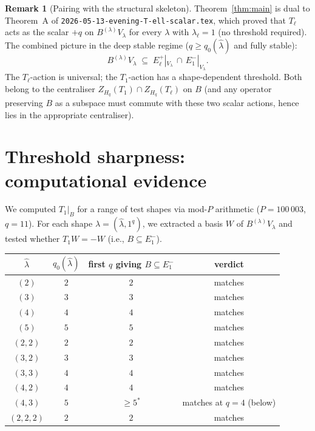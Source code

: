 \documentclass[11pt]{article}
\theoremstyle{definition}
\newtheorem{remark}[theorem]{Remark}
\begin{document}
\begin{remark}[Pairing with the structural skeleton]
Theorem~\ref{thm:main} is dual to Theorem~A of
\texttt{2026-05-13-evening-T-ell-scalar.tex}, which proved that
$T_\ell$ acts as the scalar $+q$ on $B^{(\lambda)} V_\lambda$ for
every $\lambda$ with $\lambda_\ell = 1$ (no threshold required). The
combined picture in the deep stable regime ($q \ge q_0(\hat\lambda)$
and fully stable):
\[
   B^{(\lambda)} V_\lambda
   \;\subseteq\;
   E_\ell^+|_{V_\lambda}\,\cap\,E_1^-|_{V_\lambda}.
\]
The $T_\ell$-action is universal; the $T_1$-action has a
shape-dependent threshold. Both belong to the centraliser
$Z_{H_q}(T_1) \cap Z_{H_q}(T_\ell)$ on $B$ (and any operator preserving
$B$ as a subspace must commute with these two scalar actions, hence
lies in the appropriate centraliser).
\end{remark}

\section{Threshold sharpness: computational evidence}\label{sec:sharp}

We computed $T_1|_B$ for a range of test shapes via mod-$P$ arithmetic
($P = 100\,003$, $q = 11$). For each shape $\lambda = (\hat\lambda, 1^q)$,
we extracted a basis $W$ of $B^{(\lambda)} V_\lambda$ and tested whether
$T_1 W = -W$ (i.e., $B \subseteq E_1^-$).

\begin{center}\renewcommand{\arraystretch}{1.15}
\begin{tabular}{cccc}
\toprule
$\hat\lambda$ & $q_0(\hat\lambda)$ & first $q$ giving $B \subseteq E_1^-$ & verdict \\
\midrule
$(2)$         & $2$ & $2$ & matches \\
$(3)$         & $3$ & $3$ & matches \\
$(4)$         & $4$ & $4$ & matches \\
$(5)$         & $5$ & $5$ & matches \\
$(2, 2)$      & $2$ & $2$ & matches \\
$(3, 2)$      & $3$ & $3$ & matches \\
$(3, 3)$      & $4$ & $4$ & matches \\
$(4, 2)$      & $4$ & $4$ & matches \\
$(4, 3)$      & $5$ & $\ge 5^*$ & matches at $q=4$ (below) \\
$(2, 2, 2)$   & $2$ & $2$ & matches \\
\bottomrule
\end{tabular}
\end{center}
\end{document}
